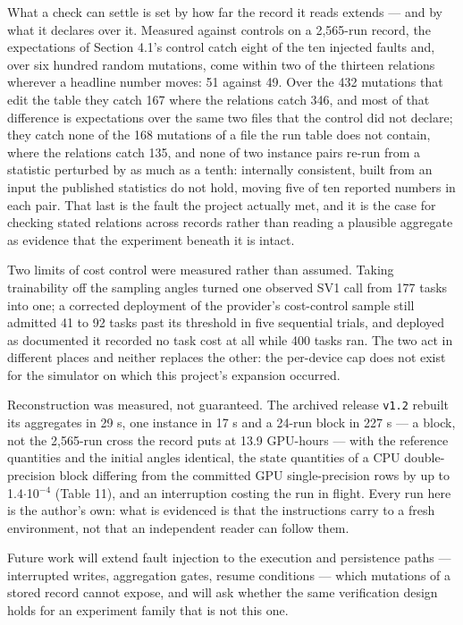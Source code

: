 \documentclass[acmsmall,screen,review]{acmart}
\begin{document}
What a check can settle is set by how far the record it reads extends --- and by what it declares over it. Measured against controls on a 2,565-run record, the expectations of Section 4.1's control catch eight of the ten injected faults and, over six hundred random mutations, come within two of the thirteen relations wherever a headline number moves: 51 against 49. Over the 432 mutations that edit the table they catch 167 where the relations catch 346, and most of that difference is expectations over the same two files that the control did not declare; they catch none of the 168 mutations of a file the run table does not contain, where the relations catch 135, and none of two instance pairs re-run from a statistic perturbed by as much as a tenth: internally consistent, built from an input the published statistics do not hold, moving five of ten reported numbers in each pair. That last is the fault the project actually met, and it is the case for checking stated relations across records rather than reading a plausible aggregate as evidence that the experiment beneath it is intact.


Two limits of cost control were measured rather than assumed. Taking trainability off the sampling angles turned one observed SV1 call from 177 tasks into one; a corrected deployment of the provider's cost-control sample still admitted 41 to 92 tasks past its threshold in five sequential trials, and deployed as documented it recorded no task cost at all while 400 tasks ran. The two act in different places and neither replaces the other: the per-device cap does not exist for the simulator on which this project's expansion occurred.


Reconstruction was measured, not guaranteed. The archived release \texttt{v1.2} rebuilt its aggregates in 29 s, one instance in 17 s and a 24-run block in 227 s --- a block, not the 2,565-run cross the record puts at 13.9 GPU-hours --- with the reference quantities and the initial angles identical, the state quantities of a CPU double-precision block differing from the committed GPU single-precision rows by up to 1.4$\cdot$10$^{-4}$ (Table 11), and an interruption costing the run in flight. Every run here is the author's own: what is evidenced is that the instructions carry to a fresh environment, not that an independent reader can follow them.


Future work will extend fault injection to the execution and persistence paths --- interrupted writes, aggregation gates, resume conditions --- which mutations of a stored record cannot expose, and will ask whether the same verification design holds for an experiment family that is not this one.
\end{document}
